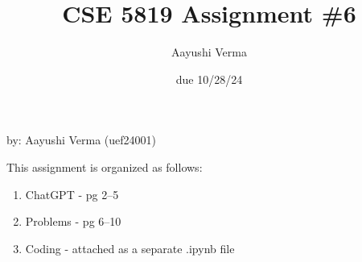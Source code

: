 \documentclass{article}
\title{CSE 5819 Assignment \#6}
\author{Aayushi Verma}
\date{due 10/28/24}
\begin{document}
\maketitle
\begin{center}
    by: Aayushi Verma (uef24001)
\end{center}

This assignment is organized as follows:

\begin{enumerate}
    \item ChatGPT - pg 2--5%
    \item Problems - pg 6--10%
    \item Coding - attached as a separate .ipynb file
\end{enumerate}

\label{chatgpt_start}
 
\label{chatgpt_end}

\label{problems_start}
  
\label{problems_end}
\end{document}

